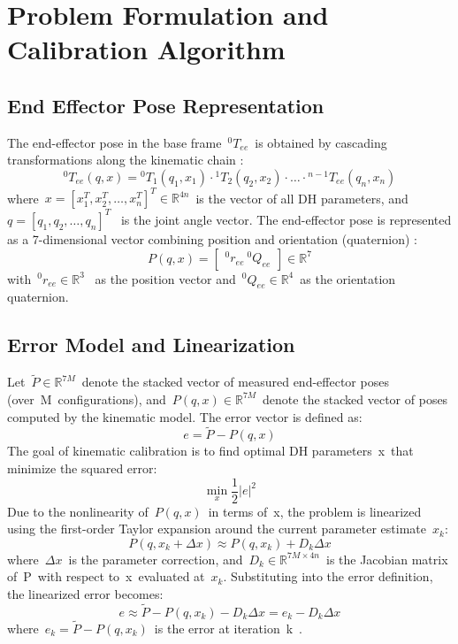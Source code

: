 \documentclass[conference]{IEEEtran}
\begin{document}
\section{Problem Formulation and Calibration Algorithm}
\subsection{End Effector Pose Representation}
The end-effector pose in the base frame \(^0T_{ee}\) is obtained by cascading transformations along the kinematic chain
:\begin{equation}^0T_{ee}(q, x) = {}^0T_1(q_1, x_1) \cdot {}^1T_2(q_2, x_2) \cdot \dots \cdot {}^{n-1}T_{ee}(q_n, x_n)\end{equation}
where \(x = [x_1^T, x_2^T, \dots, x_n^T]^T \in \mathbb{R}^{4n}\) is the vector of all DH parameters, and \(q = [q_1, q_2, \dots, q_n]^T\) 
is the joint angle vector. The end-effector pose is represented as a 7-dimensional vector combining position and orientation (quaternion)
:\begin{equation}P(q, x) = \begin{bmatrix} {}^0r_{ee} \ {}^0Q_{ee} \end{bmatrix} \in \mathbb{R}^7\end{equation}with \(^0r_{ee} \in \mathbb{R}^3\) 
as the position vector and \(^0Q_{ee} \in \mathbb{R}^4\) as the orientation quaternion.

\subsection{Error Model and Linearization}
Let \(\tilde{P} \in \mathbb{R}^{7M}\) denote the stacked vector of measured end-effector poses (over M configurations), and \(P(q, x) \in \mathbb{R}^{7M}\) denote the stacked vector of poses computed by the kinematic model. The error vector is defined as:
\begin{equation}
e = \tilde{P} - P(q, x)
\end{equation}
The goal of kinematic calibration is to find optimal DH parameters x that minimize the squared error:
\begin{equation}
\min_x \frac{1}{2} | e |^2
\end{equation}Due to the nonlinearity of \(P(q, x)\) in terms of x, the problem is linearized using the first-order Taylor expansion around the current parameter estimate \(x_k\):
\begin{equation}
P(q, x_k + \Delta x) \approx P(q, x_k) + D_k \Delta x
\end{equation}
where \(\Delta x\) is the parameter correction, and \(D_k \in \mathbb{R}^{7M \times 4n}\) is the Jacobian matrix of P with respect to x evaluated at \(x_k\). Substituting into the error definition, the linearized error becomes:
\begin{equation}
e \approx \tilde{P} - P(q, x_k) - D_k \Delta x = e_k - D_k \Delta x
\end{equation}
where \(e_k = \tilde{P} - P(q, x_k)\) is the error at iteration k .
\end{document}
